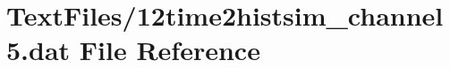 \hypertarget{12time2histsim__channel5_8dat}{}\section{Text\+Files/12time2histsim\+\_\+channel5.dat File Reference}
\label{12time2histsim__channel5_8dat}
